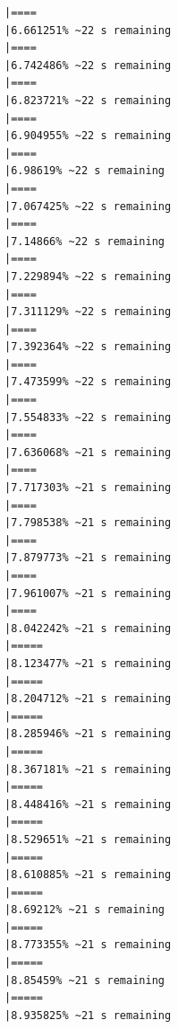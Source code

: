 \documentclass{article}\usepackage[]{graphicx}\usepackage[]{xcolor}
\makeatletter
\newenvironment{kframe}{%
 \def\at@end@of@kframe{}%
 \ifinner\ifhmode%
  \def\at@end@of@kframe{\end{minipage}}%
  \begin{minipage}{\columnwidth}%
 \fi\fi%
 \def\FrameCommand##1{\hskip\@totalleftmargin \hskip-\fboxsep
 \colorbox{shadecolor}{##1}\hskip-\fboxsep
     \hskip-\linewidth \hskip-\@totalleftmargin \hskip\columnwidth}%
 \MakeFramed {\advance\hsize-\width
   \@totalleftmargin\z@ \linewidth\hsize
   \@setminipage}}%
 {\par\unskip\endMakeFramed%
 \at@end@of@kframe}
\newenvironment{knitrout}{}{} %
\makeatother
\begin{document}
\begin{knitrout}
\begin{kframe}
\begin{verbatim}
|====                                                          |6.661251% ~22 s remaining 
|====                                                          |6.742486% ~22 s remaining 
|====                                                          |6.823721% ~22 s remaining 
|====                                                          |6.904955% ~22 s remaining 
|====                                                          |6.98619% ~22 s remaining  
|====                                                          |7.067425% ~22 s remaining 
|====                                                          |7.14866% ~22 s remaining  
|====                                                          |7.229894% ~22 s remaining 
|====                                                          |7.311129% ~22 s remaining 
|====                                                          |7.392364% ~22 s remaining 
|====                                                          |7.473599% ~22 s remaining 
|====                                                          |7.554833% ~22 s remaining 
|====                                                          |7.636068% ~21 s remaining 
|====                                                          |7.717303% ~21 s remaining 
|====                                                          |7.798538% ~21 s remaining 
|====                                                          |7.879773% ~21 s remaining 
|====                                                          |7.961007% ~21 s remaining 
|====                                                          |8.042242% ~21 s remaining 
|=====                                                         |8.123477% ~21 s remaining 
|=====                                                         |8.204712% ~21 s remaining 
|=====                                                         |8.285946% ~21 s remaining 
|=====                                                         |8.367181% ~21 s remaining 
|=====                                                         |8.448416% ~21 s remaining 
|=====                                                         |8.529651% ~21 s remaining 
|=====                                                         |8.610885% ~21 s remaining 
|=====                                                         |8.69212% ~21 s remaining  
|=====                                                         |8.773355% ~21 s remaining 
|=====                                                         |8.85459% ~21 s remaining  
|=====                                                         |8.935825% ~21 s remaining 

\end{verbatim}
\end{kframe}
\end{knitrout}
\end{document}
